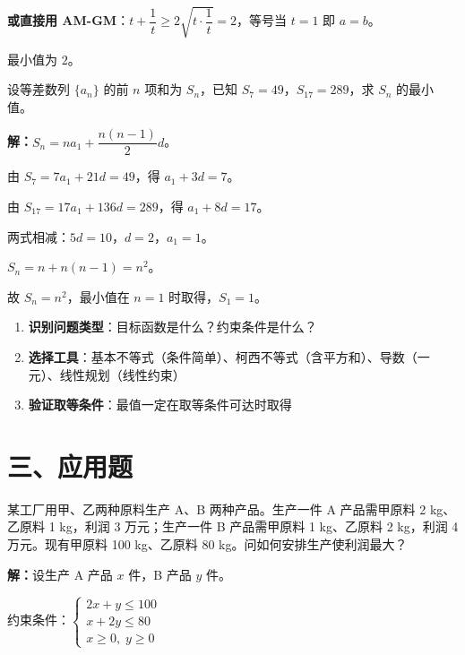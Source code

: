\documentclass[12pt, a4paper]{ctexart}
\begin{document}
\textbf{或直接用 AM-GM}：$t + \dfrac{1}{t} \ge 2\sqrt{t \cdot \dfrac{1}{t}} = 2$，等号当 $t = 1$ 即 $a = b$。

最小值为 $\boxed{2}$。

\begin{examplebox}[【例题10】综合——不等式与数列]
设等差数列 $\{a_n\}$ 的前 $n$ 项和为 $S_n$，已知 $S_7 = 49$，$S_{17} = 289$，求 $S_n$ 的最小值。
\end{examplebox}

\textbf{解：}$S_n = na_1 + \dfrac{n(n-1)}{2}d$。

由 $S_7 = 7a_1 + 21d = 49$，得 $a_1 + 3d = 7$。

由 $S_{17} = 17a_1 + 136d = 289$，得 $a_1 + 8d = 17$。

两式相减：$5d = 10$，$d = 2$，$a_1 = 1$。

$S_n = n + n(n-1) = n^2$。

故 $S_n = n^2$，最小值在 $n = 1$ 时取得，$S_1 = \boxed{1}$。

\begin{tipbox}[不等式问题的统一策略]
\begin{enumerate}[label=(\arabic*)]
  \item \textbf{识别问题类型}：目标函数是什么？约束条件是什么？
  \item \textbf{选择工具}：基本不等式（条件简单）、柯西不等式（含平方和）、导数（一元）、线性规划（线性约束）
  \item \textbf{验证取等条件}：最值一定在取等条件可达时取得
\end{enumerate}
\end{tipbox}

\section*{\textcolor{apppurple}{三、应用题}}

\begin{appbox}[【应用1】最优设计方案]
某工厂用甲、乙两种原料生产 A、B 两种产品。生产一件 A 产品需甲原料 2 kg、乙原料 1 kg，利润 3 万元；生产一件 B 产品需甲原料 1 kg、乙原料 2 kg，利润 4 万元。现有甲原料 100 kg、乙原料 80 kg。问如何安排生产使利润最大？
\end{appbox}

\textbf{解：}设生产 A 产品 $x$ 件，B 产品 $y$ 件。

约束条件：$\begin{cases} 2x + y \le 100 \\ x + 2y \le 80 \\ x \ge 0,\; y \ge 0 \end{cases}$
\end{document}

